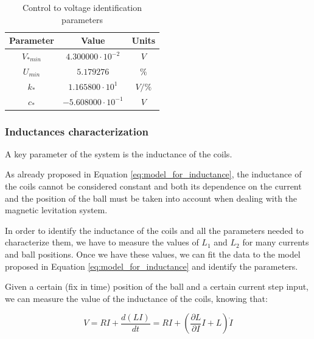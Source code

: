 \begin{table}[H]

    \centering
    \begin{tabular}{|c|c|c|}
        \hline
        \textbf{Parameter} & \textbf{Value}            & \textbf{Units} \\
        \hline
        $V_{*min}$         & $4.300000 \cdot 10^{-2}$  & $V$            \\
        $U_{min}$          & $5.179276$                & $\%$           \\
        $k_*$              & $1.165800 \cdot 10^{1}$   & $V/\%$         \\
        $c_*$              & $-5.608000 \cdot 10^{-1}$ & $V$            \\
        \hline
    \end{tabular}

    \caption{Control to voltage identification parameters}
    \label{tab:control_to_voltage_parameters}

\end{table}


\subsubsection{Inductances characterization}
\label{subsubsec:inductances_characterization}

A key parameter of the system is the inductance of the coils.

As already proposed in Equation \ref{eq:model_for_inductance}, the inductance of the coils cannot be considered constant and both its dependence on the current and the position of the ball must be taken into account when dealing with the magnetic levitation system.

In order to identify the inductance of the coils and all the parameters needed to characterize them, we have to measure the values of $L_1$ and $L_2$ for many currents and ball positions.
Once we have these values, we can fit the data to the model proposed in Equation \ref{eq:model_for_inductance} and identify the parameters.

Given a certain (fix in time) position of the ball and a certain current step input, we can measure the value of the inductance of the coils, knowing that:

\begin{equation}
    V = R I + \frac{d (L I)}{d t} = R I + \left( \frac{\partial L}{\partial I} I + L \right) \dot{I}
\end{equation}

